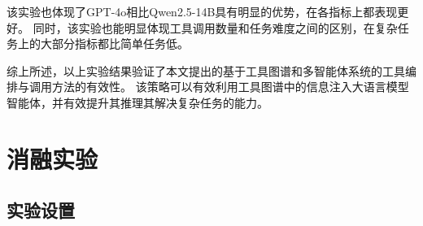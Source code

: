 该实验也体现了GPT-4o相比Qwen2.5-14B具有明显的优势，在各指标上都表现更好。
同时，该实验也能明显体现工具调用数量和任务难度之间的区别，在复杂任务上的大部分指标都比简单任务低。

综上所述，以上实验结果验证了本文提出的基于工具图谱和多智能体系统的工具编排与调用方法的有效性。
该策略可以有效利用工具图谱中的信息注入大语言模型智能体，并有效提升其推理其解决复杂任务的能力。








\section{消融实验}

\subsection{实验设置}

